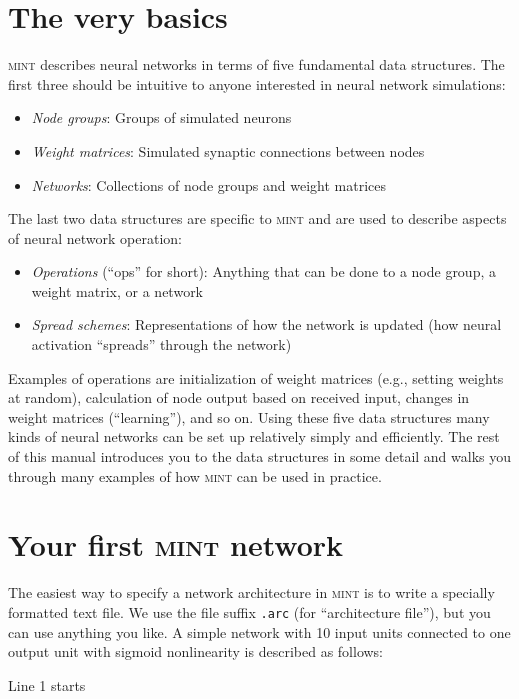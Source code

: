 \documentclass[12pt,letterpaper]{memoir}
\newcommand{\mint}{{\scshape\sffamily mint}\xspace}
\begin{document}
\section{The very basics}
\label{sec:the-very-basics}

\mint describes neural networks in terms of five fundamental data
structures. The first three should be intuitive to anyone interested
in neural network simulations:
\begin{itemize}
\item \textit{Node groups}: Groups of simulated neurons
\item \textit{Weight matrices}: Simulated synaptic connections between
  nodes
\item \textit{Networks}: Collections of node groups and weight
  matrices
\end{itemize}
The last two data structures are specific to \mint and are used to
describe aspects of neural network operation:
\begin{itemize}
\item \textit{Operations} (``ops'' for short): Anything that can be
  done to a node group, a weight matrix, or a network
\item\textit{Spread schemes}: Representations of how the network
  is updated (how neural activation ``spreads'' through the network)
\end{itemize}
Examples of operations are initialization of weight matrices (e.g.,
setting weights at random), calculation of node output based on
received input, changes in weight matrices (``learning''), and so
on. Using these five data structures many kinds of neural networks can
be set up relatively simply and efficiently. The rest of this manual
introduces you to the data structures in some detail and walks you
through many examples of how \mint can be used in practice.

\section{Your first \mint network}
\label{sec:first-mint}

The easiest way to specify a network architecture in \mint is to write
a specially formatted text file. We use the file suffix
\lstinline{.arc} (for ``architecture file''), but you can use anything
you like.  A simple network with 10 input units connected to one
output unit with sigmoid nonlinearity is described as follows:

 Line 1 starts
\end{document}
